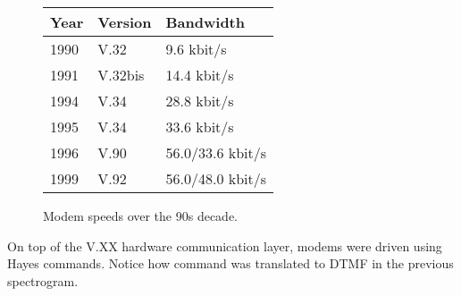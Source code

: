  \begin{figure}[H]
\centering  
\begin{tabularx}{\textwidth}{ L{0.2} L{0.3} L{0.5}}
  \toprule
  \textbf{Year} & \textbf{Version} & \textbf{Bandwidth} \\
  \toprule 
   
    1990 & V.32 & 9.6 kbit/s \\
    1991 & V.32bis &  14.4 kbit/s \\
    1994 & V.34 & 28.8 kbit/s \\
    1995 & V.34 & 33.6 kbit/s \\
    1996 & V.90 & 56.0/33.6 kbit/s\\
    1999 & V.92 & 56.0/48.0 kbit/s\\
   
   \toprule
\end{tabularx}
\caption{Modem speeds over the 90s decade.\protect\footnotemark}
\end{figure}


\par
On top of the V.XX hardware communication layer, modems were driven using Hayes commands. Notice how command  was translated to DTMF in the previous spectrogram.\\%

